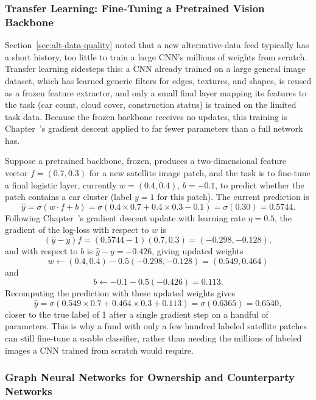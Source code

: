 \documentclass[../ai_in_finance]{subfiles}
\begin{document}
\subsubsection*{Transfer Learning: Fine-Tuning a Pretrained Vision Backbone}

Section~\ref{sec:alt-data-quality} noted that a new alternative-data feed typically has a short history, too little to train a large CNN's millions of weights from scratch. Transfer learning sidesteps this: a CNN already trained on a large general image dataset, which has learned generic filters for edges, textures, and shapes, is reused as a frozen feature extractor, and only a small final layer mapping its features to the task (car count, cloud cover, construction status) is trained on the limited task data. Because the frozen backbone receives no updates, this training is Chapter~'s gradient descent applied to far fewer parameters than a full network has.

Suppose a pretrained backbone, frozen, produces a two-dimensional feature vector $f = (0.7, 0.3)$ for a new satellite image patch, and the task is to fine-tune a final logistic layer, currently $w = (0.4, 0.4)$, $b = -0.1$, to predict whether the patch contains a car cluster (label $y=1$ for this patch). The current prediction is
$$\hat y = \sigma(w \cdot f + b) = \sigma(0.4 \times 0.7 + 0.4 \times 0.3 - 0.1) = \sigma(0.30) = 0.5744.$$
Following Chapter~'s gradient descent update with learning rate $\eta = 0.5$, the gradient of the log-loss with respect to $w$ is
$$(\hat y - y)f = (0.5744-1)(0.7, 0.3) = (-0.298, -0.128),$$
and with respect to $b$ is $\hat y - y = -0.426$, giving updated weights
$$w \leftarrow (0.4, 0.4) - 0.5(-0.298,-0.128) = (0.549, 0.464)$$
and
$$b \leftarrow -0.1 - 0.5(-0.426) = 0.113.$$
Recomputing the prediction with these updated weights gives
$$\hat y = \sigma(0.549 \times 0.7 + 0.464 \times 0.3 + 0.113) = \sigma(0.6365) = 0.6540,$$
closer to the true label of 1 after a single gradient step on a handful of parameters. This is why a fund with only a few hundred labeled satellite patches can still fine-tune a usable classifier, rather than needing the millions of labeled images a CNN trained from scratch would require.

\subsubsection*{Graph Neural Networks for Ownership and Counterparty Networks}
\end{document}
